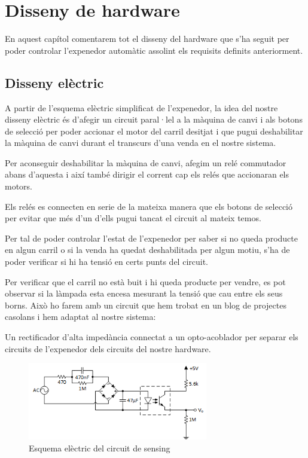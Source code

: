 \chapter{Disseny de hardware}\label{chapter:disseny de hardware}
En aquest capítol comentarem tot el disseny del hardware que s'ha seguit per poder controlar l'expenedor automàtic assolint els requisits definits anteriorment.

\section{Disseny elèctric}
A partir de l'esquema elèctric simplificat de l'expenedor, la idea del nostre disseny elèctric és d'afegir un circuit paral·lel a la màquina de canvi i als botons de selecció per poder accionar el motor del carril desitjat i que pugui deshabilitar la màquina de canvi durant el transcurs d'una venda en el nostre sistema. 

Per aconseguir deshabilitar la màquina de canvi, afegim un relé commutador abans d'aquesta i així també dirigir el corrent cap els relés que accionaran els motors.

Els relés es connecten en serie de la mateixa manera que els botons de selecció per evitar que més d'un d'ells pugui tancat el circuit al mateix temos.

Per tal de poder controlar l'estat de l'expenedor per saber si no queda producte en algun carril o si la venda ha quedat deshabilitada per algun motiu, s'ha de poder verificar si hi ha tensió en certs punts del circuit.

Per verificar que el carril no està buit i hi queda producte per vendre, es pot observar si la làmpada esta encesa mesurant la tensió que cau entre els seus borns. Això ho farem amb un circuit que hem trobat en un blog\autocite{sensing-circuit} de projectes casolans i hem adaptat al nostre sistema:

Un rectificador d'alta impedància connectat a un opto-acoblador per separar els circuits de l'expenedor dels circuits del nostre hardware.

\begin{figure}[H]
\center
\includegraphics[width=0.7\textwidth]{images/sensing}
\caption{Esquema elèctric del circuit de sensing}
\label{fig:sensing_board}
\end{figure}

